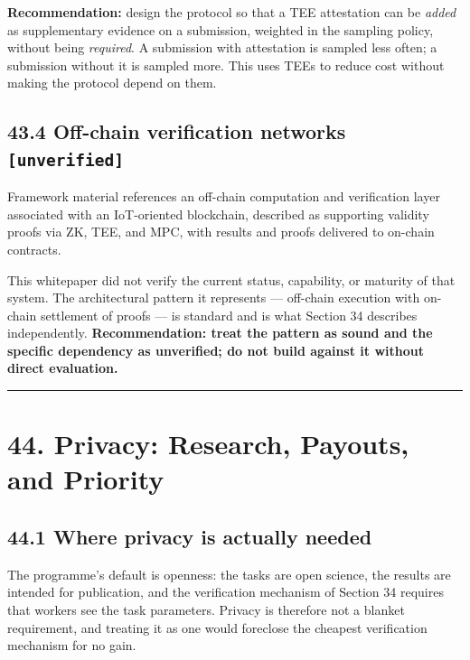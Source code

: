 \documentclass[
  11pt]{report}
\begin{document}
\textbf{Recommendation:} design the protocol so that a TEE attestation
can be \emph{added} as supplementary evidence on a submission, weighted
in the sampling policy, without being \emph{required}. A submission with
attestation is sampled less often; a submission without it is sampled
more. This uses TEEs to reduce cost without making the protocol depend
on them.

\hypertarget{off-chain-verification-networks-unverified}{%
\section{\texorpdfstring{43.4 Off-chain verification networks
\texttt{{[}unverified{]}}}{43.4 Off-chain verification networks {[}unverified{]}}}\label{off-chain-verification-networks-unverified}}

Framework material references an off-chain computation and verification
layer associated with an IoT-oriented blockchain, described as
supporting validity proofs via ZK, TEE, and MPC, with results and proofs
delivered to on-chain contracts.

This whitepaper did not verify the current status, capability, or
maturity of that system. The architectural pattern it represents ---
off-chain execution with on-chain settlement of proofs --- is standard
and is what Section 34 describes independently. \textbf{Recommendation:
treat the pattern as sound and the specific dependency as unverified; do
not build against it without direct evaluation.}

\begin{center}\rule{0.5\linewidth}{0.5pt}\end{center}

\hypertarget{privacy-research-payouts-and-priority}{%
\chapter{44. Privacy: Research, Payouts, and
Priority}\label{privacy-research-payouts-and-priority}}

\hypertarget{where-privacy-is-actually-needed}{%
\section{44.1 Where privacy is actually
needed}\label{where-privacy-is-actually-needed}}

The programme's default is openness: the tasks are open science, the
results are intended for publication, and the verification mechanism of
Section 34 requires that workers see the task parameters. Privacy is
therefore not a blanket requirement, and treating it as one would
foreclose the cheapest verification mechanism for no gain.
\end{document}

